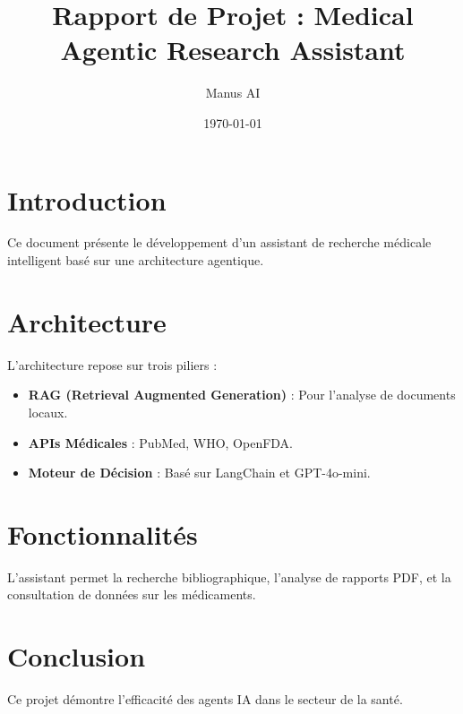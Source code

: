 \documentclass{article}
\title{Rapport de Projet : Medical Agentic Research Assistant}
\author{Manus AI}
\date{\today}
\begin{document}
\maketitle

\section{Introduction}
Ce document présente le développement d'un assistant de recherche médicale intelligent basé sur une architecture agentique.

\section{Architecture}
L'architecture repose sur trois piliers :
\begin{itemize}
    \item \textbf{RAG (Retrieval Augmented Generation)} : Pour l'analyse de documents locaux.
    \item \textbf{APIs Médicales} : PubMed, WHO, OpenFDA.
    \item \textbf{Moteur de Décision} : Basé sur LangChain et GPT-4o-mini.
\end{itemize}

\section{Fonctionnalités}
L'assistant permet la recherche bibliographique, l'analyse de rapports PDF, et la consultation de données sur les médicaments.

\section{Conclusion}
Ce projet démontre l'efficacité des agents IA dans le secteur de la santé.
\end{document}
